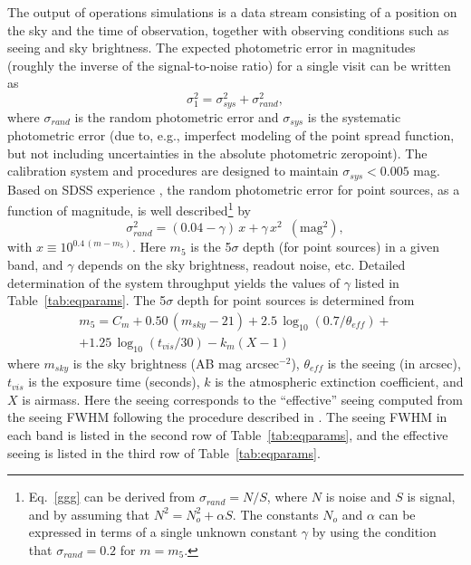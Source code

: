 The output of operations simulations is a data stream consisting of
a position on the sky and the time of observation, together with
observing conditions such as seeing and sky brightness. The expected
photometric error in magnitudes (roughly the inverse of the
signal-to-noise ratio) for a single visit can be written as
\begin{equation}
         \sigma_1^2 = \sigma_{sys}^2 + \sigma_{rand}^2,
\end{equation}
where $\sigma_{rand}$ is the random photometric error and $\sigma_{sys}$ is
the systematic photometric error (due to, e.g., imperfect
modeling of the point spread function, but not including uncertainties
in the
absolute photometric zeropoint). The calibration system and procedures
are designed to maintain $\sigma_{sys}<0.005$ mag. Based on
SDSS experience \citep{2007AJ....134.2236S}, the random photometric error for
point sources, as
a function of magnitude, is well described\footnote{Eq.~\ref{ggg} can
be derived from $\sigma_{rand}=N/S$, where $N$ is noise and $S$ is signal,
and by assuming that $N^2 = N_o^2 + \alpha S$. The constants $N_o$ and
$\alpha$ can be expressed in terms of a single unknown constant $\gamma$
by using the condition that $\sigma_{rand}=0.2$ for $m=m_5$.} by
\begin{equation}
\label{ggg}
  \sigma_{rand}^2 = (0.04-\gamma)\, x + \gamma \, x^2 \,\,\, \mathrm{(mag^2),}
\end{equation}
with $x \equiv 10^{0.4\,(m-m_5)}$. Here $m_5$ is the 5$\sigma$ depth (for
point sources) in a given band, and $\gamma$ depends on the sky
brightness, readout noise, etc.
Detailed determination of the system throughput yields the values of $\gamma$
listed in Table~\ref{tab:eqparams}. The 5$\sigma$ depth for point sources is determined from
\begin{eqnarray}
\label{m5}
  m_5 = C_m + 0.50\,(m_{sky}-21) + 2.5\,\log_{10}(0.7/\theta_{eff}) +  \nonumber \\
        + 1.25\,\log_{10}(t_{vis}/30) - k_m(X-1) \phantom{xxxxx}
\end{eqnarray}
where $m_{sky}$ is the sky brightness (AB mag arcsec$^{-2}$), $\theta_{eff}$ is
the seeing (in arcsec), $t_{vis}$ is the exposure time (seconds),
$k$ is the atmospheric extinction coefficient, and $X$ is airmass. Here
the seeing corresponds to the ``effective'' seeing computed from
the seeing FWHM following the procedure described in \cite{2016SPIE.9911E..18A}.
The seeing FWHM in each band is listed in
the second row of Table~\ref{tab:eqparams}, and the effective seeing is listed in the
third row of Table~\ref{tab:eqparams}.

